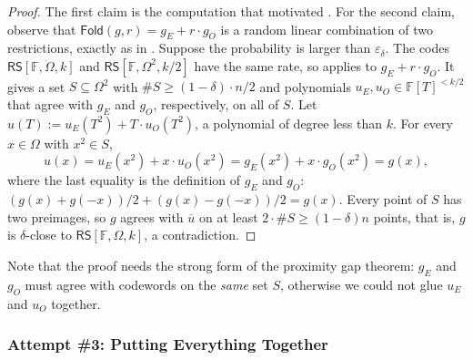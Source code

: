\documentclass[../../book]{subfiles}
\begin{document}
\begin{proof}
    The first claim is the computation that motivated .
    For the second claim, observe that $\mathsf{Fold}(g, r) = g_E + r \cdot g_O$ is a random linear combination of two restrictions, exactly as in .
    Suppose the probability is larger than $\varepsilon_\delta$.
    The codes $\mathsf{RS}[\mathbb{F}, \Omega, k]$ and $\mathsf{RS}[\mathbb{F}, \Omega^2, k/2]$ have the same rate, so  applies to $g_E + r \cdot g_O$.
    It gives a set $S \subseteq \Omega^2$ with $\#S \geq (1 - \delta) \cdot n/2$ and polynomials $u_E, u_O \in \mathbb{F}[T]^{<k/2}$ that agree with $g_E$ and $g_O$, respectively, on all of $S$.
    Let $u(T) := u_E(T^2) + T \cdot u_O(T^2)$, a polynomial of degree less than $k$.
    For every $x \in \Omega$ with $x^2 \in S$,
    \begin{equation*}
        u(x) = u_E(x^2) + x \cdot u_O(x^2) = g_E(x^2) + x \cdot g_O(x^2) = g(x),
    \end{equation*}
    where the last equality is the definition of $g_E$ and $g_O$: $(g(x) + g(-x))/2 + (g(x) - g(-x))/2 = g(x)$.
    Every point of $S$ has two preimages, so $g$ agrees with $\overline{u}$ on at least $2 \cdot \#S \geq (1 - \delta) n$ points, that is, $g$ is $\delta$-close to $\mathsf{RS}[\mathbb{F}, \Omega, k]$, a contradiction.
\end{proof}

\begin{remark}
    Note that the proof needs the strong form of the proximity gap theorem: $g_E$ and $g_O$ must agree with codewords on the \emph{same} set $S$, otherwise we could not glue $u_E$ and $u_O$ together.
\end{remark}

\subsubsection{Attempt \#3: Putting Everything Together}
\end{document}
